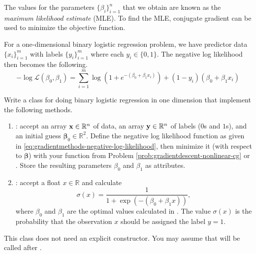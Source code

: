 The values for the parameters  $\{\beta_i\}_{i = 1}^{n}$ that we obtain are known as the \emph{maximum likelihood estimate} (MLE).
To find the MLE, conjugate gradient can be used to minimize the objective function.

For a one-dimensional binary logistic regression problem, we have predictor data $\{x_i\}_{i=1}^m$ with labels $\{y_i\}_{i=1}^m$ where each $y_i \in \{0, 1\}$.
The negative log likelihood then becomes the following.
\begin{equation}
-\log\mathcal{L}(\beta_0, \beta_1) = \sum_{i=1}^m \log(1 + e^{-(\beta_0 + \beta_1 x_i)}) + (1 - y_i)(\beta_0 + \beta_1 x_i)
\label{eq:gradientmethods-negative-log-likelihood}
\end{equation}

\begin{problem}
Write a class for doing binary logistic regression in one dimension that implement the following methods.
\begin{enumerate}
\item {}: accept an array $\mathbf{x}\in\mathbb{R}^n$ of data, an array $\mathbf{y}\in\mathbb{R}^n$ of labels ($0$s and $1$s), and an initial guess $\boldsymbol{\beta}_0\in\mathbb{R}^2$.
Define the negative log likelihood function as given in \eqref{eq:gradientmethods-negative-log-likelihood}, then minimize it (with respect to $\boldsymbol{\beta}$) with your function from Problem \ref{prob:gradientdescent-nonlinear-cg} or .
Store the resulting parameters $\beta_0$ and $\beta_1$ as attributes.

\item {}: accept a float $x\in\mathbb{R}$ and calculate
\[\sigma(x) = \frac{1}{1 + \exp(- (\beta_0 + \beta_1 x))},\]
where $\beta_0$ and $\beta_1$ are the optimal values calculated in .
The value $\sigma(x)$ is the probability that the observation $x$ should be assigned the label $y=1$.
\end{enumerate}
This class does not need an explicit constructor.
You may assume that  will be called after .
\label{prob:gradientmethods-logistic-regression}
\end{problem}

